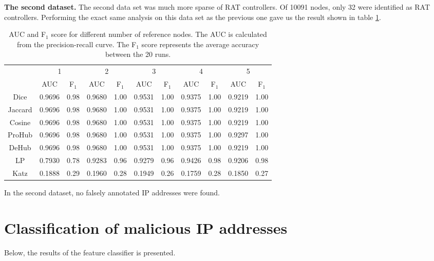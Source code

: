 \textbf{The second dataset.} The second data set was much more sparse of RAT controllers. Of 10091 nodes, only 32 were identified as RAT controllers. Performing the exact same analysis on this data set as the previous one gave us the result shown in table \ref{aucIndex2}.

\begin{table}[h!]
    \centering
    \caption{AUC and F$_1$ score for different number of reference nodes. The AUC is calculated from the precision-recall curve. The F$_1$ score represents the average accuracy between the 20 runs.}
    \begin{tabular}{|c||c|c||c|c||c|c||c|c||c|c|}
      \hline
      \multirow{2}{*}{~} 
            & \multicolumn{2}{c||}{1}
            & \multicolumn{2}{c||}{2}
            & \multicolumn{2}{c||}{3}
            & \multicolumn{2}{c||}{4}
            & \multicolumn{2}{|c|}{5} \\             \cline{2-11}
      ~     &AUC&F$_1$&AUC&F$_1$&AUC&F$_1$&AUC&F$_1$&AUC&F$_1$ \\ \hline
    Dice    & 0.9696 & 0.98 & 0.9680 & 1.00 & 0.9531 & 1.00 & 0.9375 & 1.00 & 0.9219 & 1.00 \\
    Jaccard & 0.9696 & 0.98 & 0.9680 & 1.00 & 0.9531 & 1.00 & 0.9375 & 1.00 & 0.9219 & 1.00 \\
    Cosine  & 0.9696 & 0.98 & 0.9680 & 1.00 & 0.9531 & 1.00 & 0.9375 & 1.00 & 0.9219 & 1.00 \\
    ProHub  & 0.9696 & 0.98 & 0.9680 & 1.00 & 0.9531 & 1.00 & 0.9375 & 1.00 & 0.9297 & 1.00 \\
    DeHub   & 0.9696 & 0.98 & 0.9680 & 1.00 & 0.9531 & 1.00 & 0.9375 & 1.00 & 0.9219 & 1.00 \\ 
    LP      & 0.7930 & 0.78 & 0.9283 & 0.96 & 0.9279 & 0.96 & 0.9426 & 0.98 & 0.9206 & 0.98 \\ 
    Katz    & 0.1888 & 0.29 & 0.1960 & 0.28 & 0.1949 & 0.26 & 0.1759 & 0.28 & 0.1850 & 0.27 \\ \hline
    \end{tabular}
    \label{aucIndex2}
\end{table}

In the second dataset, no falsely annotated IP addresses were found. 

\nopagebreak
\FloatBarrier
\section{Classification of malicious IP addresses}
Below, the results of the feature classifier is presented. 

